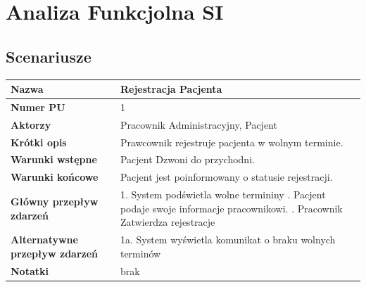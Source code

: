 \documentclass{article}
\begin{document}
	\section{Analiza Funkcjolna SI}
	\subsection*{Scenariusze}
		\begin{tabular}{|m{10em}|m{30em}|}
	\hline
	\textbf{Nazwa} & Rejestracja Pacjenta \\
	\hline
	\textbf{Numer PU} & 1 \\
	\hline
	\textbf{Aktorzy} & Pracownik Administracyjny, Pacjent \\
	\hline
	\textbf{Krótki opis} & Prawcownik rejestruje pacjenta w wolnym terminie. \\
	\hline
	\textbf{Warunki wstępne} & Pacjent Dzwoni do przychodni. \\
	\hline
	\textbf{Warunki końcowe} & Pacjent jest poinformowany o statusie rejestracji.\\
	\hline
	\textbf{Główny przepływ zdarzeń} & 
		1. System podświetla wolne termininy \newline
		2. Pacjent podaje swoje informacje pracownikowi. \newline
		3. Pracownik Zatwierdza rejestracje   \\
	\hline
	\textbf{Alternatywne przepływ zdarzeń} & 1a. System wyświetla komunikat o braku wolnych terminów\\
	\hline 
	\textbf{Notatki} & brak \\
	\hline
	\end{tabular}
	
    \vspace{1cm}
    
\end{document}
